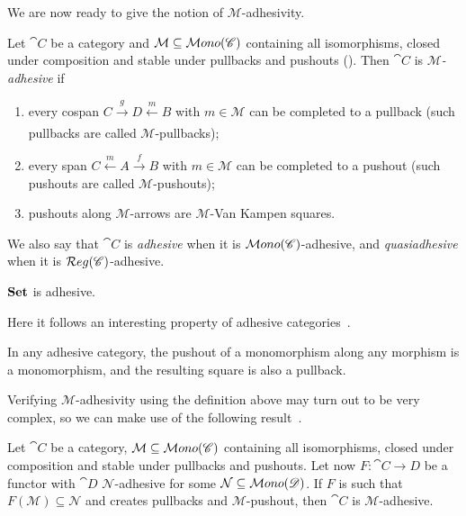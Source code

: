 We are now ready to give the notion of $\mathcal M$-adhesivity. %

\begin{definition}\label{def:adh}
    Let $\cat C$ be a category and $\mathcal M \subseteq \mathcal{M}ono(\mathscr{C})$ containing all isomorphisms, closed under composition and stable under pullbacks and pushouts ().
    Then $\cat C$ is \emph{$\mathcal M$-adhesive} if
    \begin{enumerate}
        \item every cospan $C \xrightarrow[]{g} D \xleftarrow[]{m} B$ with $m \in \mathcal M$ can be completed to a pullback (such pullbacks are called $\mathcal M$-pullbacks);
        \item every span $C \xleftarrow{m} A \xrightarrow{f} B$ with $ m \in \mathcal M$ can be completed to a pushout (such pushouts are called $\mathcal M$-pushouts);
        \item pushouts along $\mathcal M$-arrows are $\mathcal M$-Van Kampen squares.
    \end{enumerate}
    We also say that $\cat C$ is \emph{adhesive} when it is $\mathcal{M}ono(\mathscr{C})$-adhesive, and \emph{quasiadhesive} when it is $\mathcal{R}eg(\mathscr{C})$-adhesive.
\end{definition}

\begin{obs}
    $\mathbf{Set}$ is adhesive.
\end{obs}

Here it follows an interesting property of adhesive categories~\cite{lack2011embeddingtheoremadhesivecategories}.

\begin{prop}\label{prop:monos_are_preserved_by_pullbacks_in_adh_cats}
    In any adhesive category, the pushout of a monomorphism along any morphism is a monomorphism, and the resulting square is also a pullback.
\end{prop}

Verifying $\mathcal M$-adhesivity using the definition above may turn out to be very complex, so we can make use of the following result~\cite{castelnovo2022newcriterionmathcalmmathcalnadhesivity}. 

\begin{theorem}\label{th:crit_for_adh}
    Let $\cat C$ be a category, $\mathcal M \subseteq \mathcal{M}ono(\mathscr{C})$ containing all isomorphisms, closed under composition and stable under pullbacks and pushouts. Let now $F: \cat{C \rightarrow D}$ be a functor with $\cat D$ $\mathcal{N}$-adhesive for some $\mathcal{N} \subseteq \mathcal{M}ono(\mathscr{D})$.
    If $F$ is such that $F(\mathcal{M}) \subseteq \mathcal N$ and creates pullbacks and $\mathcal{M}$-pushout, then $\cat C$ is $\mathcal M$-adhesive.
\end{theorem}

